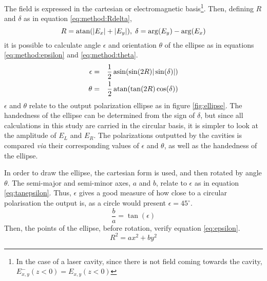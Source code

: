 The field is expressed in the cartesian or electromagnetic basis\footnote{In the case of a laser cavity, since there is not field coming towards the cavity, $E_{x,y}^-(z<0)=E_{x,y}(z<0)$}. Then, defining $R$ and $\delta$ as in equation \ref{eq:method:Rdelta},
\begin{equation}
R = \atan(|E_x|+|E_y|),\;\delta = \arg(E_y) - \arg(E_x) \label{eq:method:Rdelta}
\end{equation}
it is possible to calculate angle $\epsilon$ and orientation $\theta$ of the ellipse as in equations \ref{eq:method:epsilon} and \ref{eq:method:theta}\cite{weir_optical_2019}.
\begin{eqnarray}
\epsilon &=& \frac{1}{2}\asin(\sin(2R)|\sin(\delta)|) \label{eq:method:epsilon}\\
\theta &=& \frac{1}{2}\atan(\tan(2R)\cos(\delta)) \label{eq:method:theta}
\end{eqnarray}
$\epsilon$ and $\theta$ relate to the output polarization ellipse as in figure \ref{fig:ellipse}. The handedness of the ellipse can be determined from the sign of $\delta$, but since all calculations in this study are carried in the circular basis, it is simpler to look at the amplitude of $E_L$ and $E_R$. The polarizations outputted by the cavities is compared \textit{via} their corresponding values of $\epsilon$ and $\theta$, as well as the handedness of the ellipse.

In order to draw the ellipse, the cartesian form is used, and then rotated by angle $\theta$. The semi-major and semi-minor axes, $a$ and $b$, relate to $\epsilon$ as in equation \ref{eq:tanepsilon}. Thus, $\epsilon$ gives a good measure of how close to a circular polarisation the output is, as a circle would present $\epsilon=45^\circ$.
\begin{equation}
\frac{b}{a}=\tan(\epsilon) \label{eq:tanepsilon}
\end{equation}
%
Then, the points of the ellipse, before rotation, verify equation \ref{eq:epsilon}.
\begin{equation}
R^2 = ax^2+by^2\label{eq:ellipse}
\end{equation}


